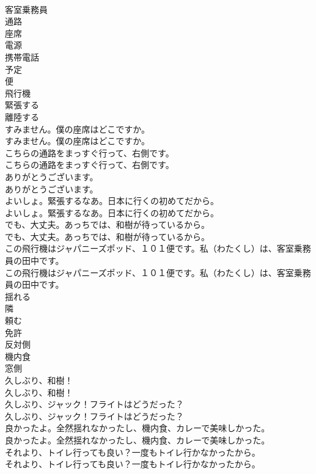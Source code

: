 \documentclass[8pt]{extreport}
\begin{document}
\begin{CJK}{UTF8}{min}
\\	客室乗務員
\\	通路
\\	座席
\\	電源
\\	携帯電話
\\	予定
\\	便
\\	飛行機
\\	緊張する
\\	離陸する
\\	すみません。僕の座席はどこですか。	
\\	すみません。僕の座席はどこですか。 
\\	こちらの通路をまっすぐ行って、右側です。	
\\	こちらの通路をまっすぐ行って、右側です。 
\\	ありがとうございます。	
\\	ありがとうございます。 
\\	よいしょ。緊張するなあ。日本に行くの初めてだから。	
\\	よいしょ。緊張するなあ。日本に行くの初めてだから。 
\\	でも、大丈夫。あっちでは、和樹が待っているから。	
\\	でも、大丈夫。あっちでは、和樹が待っているから。 
\\	この飛行機はジャパニーズポッド、１０１便です。私（わたくし）は、客室乗務員の田中です。	
\\	この飛行機はジャパニーズポッド、１０１便です。私（わたくし）は、客室乗務員の田中です。 
\\	揺れる
\\	隣
\\	頼む
\\	免許
\\	反対側
\\	機内食
\\	窓側
\\	久しぶり、和樹！	
\\	久しぶり、和樹！ 
\\	久しぶり、ジャック！フライトはどうだった？	
\\	久しぶり、ジャック！フライトはどうだった？ 
\\	良かったよ。全然揺れなかったし、機内食、カレーで美味しかった。	
\\	良かったよ。全然揺れなかったし、機内食、カレーで美味しかった。 
\\	それより、トイレ行っても良い？一度もトイレ行かなかったから。	
\\	それより、トイレ行っても良い？一度もトイレ行かなかったから。 

\end{CJK}
\end{document}
